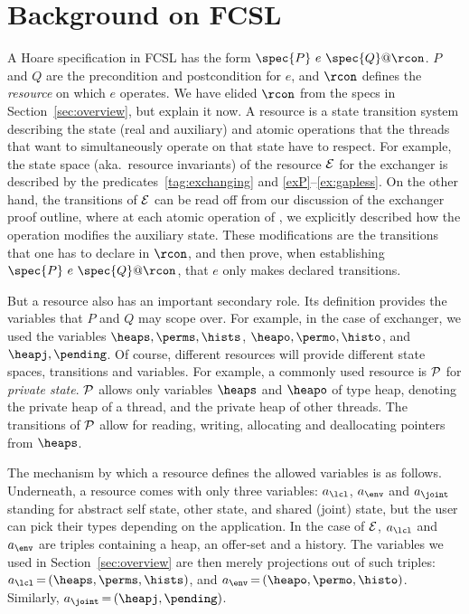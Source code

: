 \section{Background on FCSL}
\label{sec:background}

A Hoare specification in FCSL has the form
$\spec{P}\ e\ \spec{Q} @ \rcon$. $P$ and $Q$ are the precondition and
postcondition for $e$, and $\rcon$ defines the \emph{resource} on
which $e$ operates. We have elided $\rcon$ from the specs in
Section~\ref{sec:overview}, but explain it now. A resource is a state
transition system describing the state (real and auxiliary) and atomic
operations that the threads that want to simultaneously operate on
that state have to respect. For example, the state space
(aka.~resource invariants) of the resource $\cal E$ for the exchanger
is described by the predicates~\eqref{tag:exchanging} and
\ref{exP}--\ref{ex:gapless}. On the other hand, the transitions of
$\cal E$ can be read off from our discussion of the exchanger proof
outline, where at each atomic operation of , we explicitly
described how the operation modifies the auxiliary state. These
modifications are the transitions that one has to declare in $\rcon$,
and then prove, when establishing $\spec{P}\ e\ \spec{Q} @ \rcon$,
that $e$ only makes declared transitions.

But a resource also has an important secondary role. Its definition
provides the variables that $P$ and $Q$ may scope over. For example,
in the case of exchanger, we used the variables $\heaps, \perms,
\hists$, $\heapo, \permo, \histo$, and $\heapj, \pending$.  Of course,
different resources will provide different state spaces, transitions
and variables. For example, a commonly used resource is $\cal P$ for
\emph{private state}. $\cal P$ allows only variables $\heaps$ and
$\heapo$ of type heap, denoting the private heap of a thread, and the
private heap of other threads. The transitions of $\cal P$ allow for
reading, writing, allocating and deallocating pointers from $\heaps$.

The mechanism by which a resource defines the allowed variables is as
follows. Underneath, a resource comes with only three variables:
$a_\lcl$, $a_\env$ and $a_\joint$ standing for abstract self state,
other state, and shared (joint) state, but the user can pick their
types depending on the application. In the case of $\cal E$, $a_\lcl$
and $a_\env$ are triples containing a heap, an offer-set and a
history. The variables we used in Section~\ref{sec:overview} are then
merely projections out of such triples:
$a_\lcl\,{=}\,(\heaps, \perms, \hists)$, and
$a_\env\,{=}\,(\heapo, \permo, \histo)$. Similarly,
$a_\joint\,{=}\,(\heapj, \pending)$.

